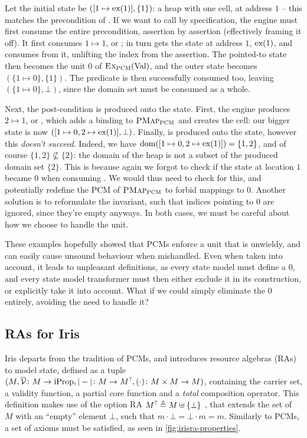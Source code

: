 Let the initial state be $([1\mapsto \text{ex}(1)], \{ 1\} )$: a heap with one cell, at address $1$ -- this matches the precondition of . If we want to call  by specification, the engine must first consume the entire precondition, assertion by assertion (effectively framing it off). It first consumes $1\mapsto 1$, or ; \PMap{} in turn gets the state at address $1$, $\text{ex}(1)$, and consumes  from it, unlifting the index from the assertion. The pointed-to state then becomes the unit $0$ of $\textsc{Ex}_{\textsc{PCM}}(\text{Val})$, and the outer state becomes~$(\{ 1\mapsto 0\}, \{ 1\})$. The \domainset{} predicate is then successfully consumed too, leaving ${(\{ 1\mapsto 0\},\bot)}$, since the domain set must be consumed as a whole. 

Next, the post-condition is produced onto the state. First, the engine produces $2\mapsto 1$, or , which adds a binding to $\textsc{PMap}_{\textsc{PCM}}$ and creates the cell: our bigger state is now $([1\mapsto 0, 2\mapsto \text{ex}(1)],\bot)$. Finally,  is produced onto the state, however this \emph{doesn't succeed}. Indeed, we have $\operatorname{dom}([1\mapsto 0, 2\mapsto \text{ex}(1)])=\{1,2\}$, and of course $\{1,2\}\not\subseteq \{2\}$: the domain of the heap is not a subset of the produced domain set $\{2\}$. This is because again we forgot to check if the state at location $1$ became $0$ when consuming . We would thus need to check for this, and potentially redefine the PCM of $\textsc{PMap}_{\textsc{PCM}}$ to forbid mappings to $0$. Another solution is to reformulate the invariant, such that indices pointing to $0$ are ignored, since they're empty anyways. In both cases, we must be careful about how we choose to handle the unit.

These examples hopefully showed that PCMs enforce a unit that is unwieldy, and can easily cause unsound behaviour when mishandled. Even when taken into account, it leads to unpleasant definitions, as every state model must define a $0$, and every state model transformer must then either exclude it in its construction, or explicitly take it into account. What if we could simply eliminate the $0$ entirely, avoiding the need to handle it?

\subsection{RAs for Iris}

Iris \cite{iris1,iris2,iris3,iris} departs from the tradition of PCMs, and introduces resource algebras (RAs) to model state, defined as a tuple ${(M, \overline{\cal V}\colon M\rightarrow \text{iProp}, |-|\colon M\rightarrow M^?, (\cdot)\colon M\times M\rightarrow M)}$, containing the carrier set, a validity function, a partial core function and a \emph{total} composition operator. This definition makes use of the option RA $M^?\triangleq M\uplus\{\bot\}$ \cite{iris-option}, that extends the set of $M$ with an ``empty'' element $\bot$, such that $m\cdot\bot=\bot\cdot m=m$. Similarly to PCMs, a set of axioms must be satisfied, as seen in \autoref{fig:irisra-properties}.

